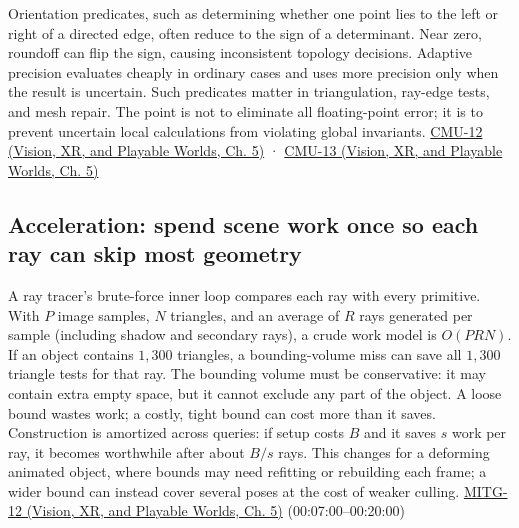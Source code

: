 Orientation predicates, such as determining whether one point lies to the left or right of a directed edge, often reduce to the sign of a determinant. Near zero, roundoff can flip the sign, causing inconsistent topology decisions. Adaptive precision evaluates cheaply in ordinary cases and uses more precision only when the result is uncertain. Such predicates matter in triangulation, ray-edge tests, and mesh repair. The point is not to eliminate all floating-point error; it is to prevent uncertain local calculations from violating global invariants. \href{../07-Vision-XR-and-Playable-Worlds/main.pdf\#nameddest=04-visual-computing-ii-ch036-cmu-12---geometric-queries}{CMU-12 (Vision, XR, and Playable Worlds, Ch. 5)} · \href{../07-Vision-XR-and-Playable-Worlds/main.pdf\#nameddest=04-visual-computing-ii-ch036-cmu-13---spatial-data-structures}{CMU-13 (Vision, XR, and Playable Worlds, Ch. 5)}

\subsection{Acceleration: spend scene work once so each ray can skip most geometry}\label{04-visual-computing-ii-ch029-acceleration-spend-scene-work-once-so-each-ray-can-skip-most-geometry}

\hypertarget{04-visual-computing-ii-ch029-acceleration-spend-scene-work-once-so-each-ray-can-skip-most-geometry}{}

A ray tracer's brute-force inner loop compares each ray with every primitive. With \(P\) image samples, \(N\) triangles, and an average of \(R\) rays generated per sample (including shadow and secondary rays), a crude work model is \(O(PRN)\). If an object contains \(1{,}300\) triangles, a bounding-volume miss can save all \(1{,}300\) triangle tests for that ray. The bounding volume must be conservative: it may contain extra empty space, but it cannot exclude any part of the object. A loose bound wastes work; a costly, tight bound can cost more than it saves. Construction is amortized across queries: if setup costs \(B\) and it saves \(s\) work per ray, it becomes worthwhile after about \(B/s\) rays. This changes for a deforming animated object, where bounds may need refitting or rebuilding each frame; a wider bound can instead cover several poses at the cost of weaker culling. \href{../07-Vision-XR-and-Playable-Worlds/main.pdf\#nameddest=04-visual-computing-ii-ch036-mitg-12---ray-tracing-ii}{MITG-12 (Vision, XR, and Playable Worlds, Ch. 5)} (00:07:00--00:20:00)

